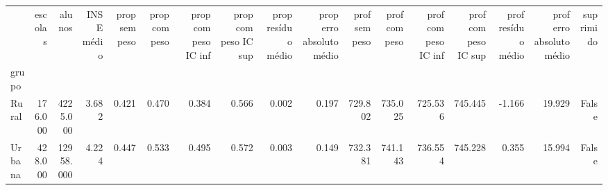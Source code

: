 \begin{tabular}{lrrrrrrrrrrrrrrrr}
\toprule
 & escolas & alunos & INSE médio & prop sem peso & prop com peso & prop com peso IC inf & prop com peso IC sup & prop resíduo médio & prop erro absoluto médio & prof sem peso & prof com peso & prof com peso IC inf & prof com peso IC sup & prof resíduo médio & prof erro absoluto médio & suprimido \\
grupo &  &  &  &  &  &  &  &  &  &  &  &  &  &  &  &  \\
\midrule
Rural & 176.000 & 4225.000 & 3.682 & 0.421 & 0.470 & 0.384 & 0.566 & 0.002 & 0.197 & 729.802 & 735.025 & 725.536 & 745.445 & -1.166 & 19.929 & False \\
Urbana & 428.000 & 12958.000 & 4.224 & 0.447 & 0.533 & 0.495 & 0.572 & 0.003 & 0.149 & 732.381 & 741.143 & 736.554 & 745.228 & 0.355 & 15.994 & False \\
\bottomrule
\end{tabular}
